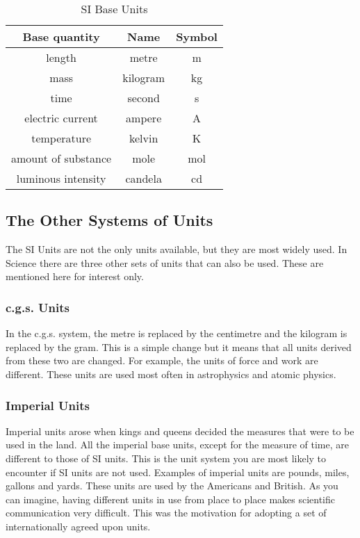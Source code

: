 \begin{table}
\centering
\begin{tabular}{|c|c|c|}\hline
\textbf{Base quantity} & \textbf{Name} & \textbf{Symbol} \\
\hline length & metre & m\\ \hline mass & kilogram & kg\\
\hline time & second & s\\ \hline electric current & ampere& A\\
\hline temperature & kelvin & K\\ \hline amount of substance &
mole & mol\\ \hline luminous intensity & candela & cd\\ \hline
\end{tabular}
\caption{SI Base Units}\label{tab:units:SIunits}
\end{table}

\subsection{The Other Systems of Units}
The SI Units are not the only units available, but they are most
widely used. In Science there are three other sets of units that
can also be used. These are mentioned here for interest only.

\subsubsection{c.g.s. Units}
In the c.g.s. system, the metre is replaced by the centimetre and
the kilogram is replaced by the gram. This is a simple change but
it means that all units derived from these two are changed. For
example, the units of force and work are different. These units
are used most often in astrophysics and atomic physics.

\subsubsection{Imperial Units}
Imperial units arose when kings and queens decided the measures
that were to be used in the land. All the imperial base units,
except for the measure of time, are different to those of SI
units. This is the unit system you are most likely to encounter if
SI units are not used. Examples of imperial units are pounds,
miles, gallons and yards. These units are used by the Americans and
British. As you can imagine, having different units in use from
place to place makes scientific communication very difficult. This
was the motivation for adopting a set of internationally agreed
upon units.

